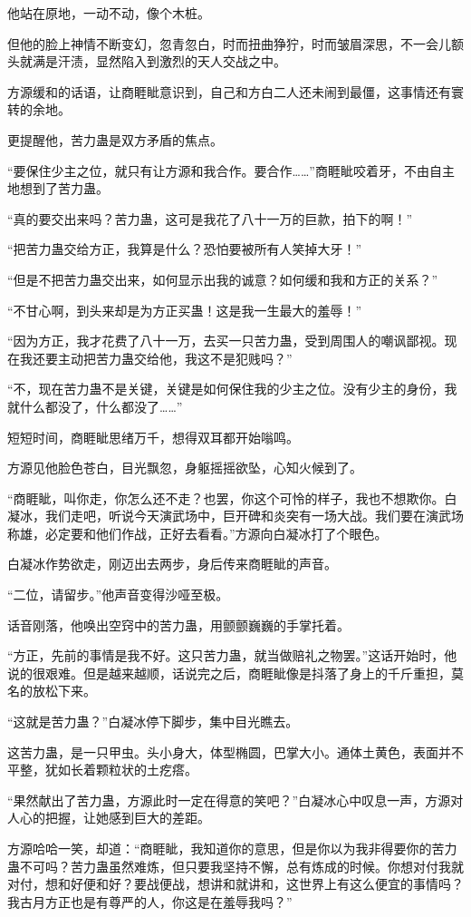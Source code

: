 \begin{this_body}
他站在原地，一动不动，像个木桩。

但他的脸上神情不断变幻，忽青忽白，时而扭曲狰狞，时而皱眉深思，不一会儿额头就满是汗渍，显然陷入到激烈的天人交战之中。

方源缓和的话语，让商睚眦意识到，自己和方白二人还未闹到最僵，这事情还有寰转的余地。

更提醒他，苦力蛊是双方矛盾的焦点。

“要保住少主之位，就只有让方源和我合作。要合作……”商睚眦咬着牙，不由自主地想到了苦力蛊。

“真的要交出来吗？苦力蛊，这可是我花了八十一万的巨款，拍下的啊！”

“把苦力蛊交给方正，我算是什么？恐怕要被所有人笑掉大牙！”

“但是不把苦力蛊交出来，如何显示出我的诚意？如何缓和我和方正的关系？”

“不甘心啊，到头来却是为方正买蛊！这是我一生最大的羞辱！”

“因为方正，我才花费了八十一万，去买一只苦力蛊，受到周围人的嘲讽鄙视。现在我还要主动把苦力蛊交给他，我这不是犯贱吗？”

“不，现在苦力蛊不是关键，关键是如何保住我的少主之位。没有少主的身份，我就什么都没了，什么都没了……”

短短时间，商睚眦思绪万千，想得双耳都开始嗡鸣。

方源见他脸色苍白，目光飘忽，身躯摇摇欲坠，心知火候到了。

“商睚眦，叫你走，你怎么还不走？也罢，你这个可怜的样子，我也不想欺你。白凝冰，我们走吧，听说今天演武场中，巨开碑和炎突有一场大战。我们要在演武场称雄，必定要和他们作战，正好去看看。”方源向白凝冰打了个眼色。

白凝冰作势欲走，刚迈出去两步，身后传来商睚眦的声音。

“二位，请留步。”他声音变得沙哑至极。

话音刚落，他唤出空窍中的苦力蛊，用颤颤巍巍的手掌托着。

“方正，先前的事情是我不好。这只苦力蛊，就当做赔礼之物罢。”这话开始时，他说的很艰难。但是越来越顺，话说完之后，商睚眦像是抖落了身上的千斤重担，莫名的放松下来。

“这就是苦力蛊？”白凝冰停下脚步，集中目光瞧去。

这苦力蛊，是一只甲虫。头小身大，体型椭圆，巴掌大小。通体土黄色，表面并不平整，犹如长着颗粒状的土疙瘩。

“果然献出了苦力蛊，方源此时一定在得意的笑吧？”白凝冰心中叹息一声，方源对人心的把握，让她感到巨大的差距。

方源哈哈一笑，却道：“商睚眦，我知道你的意思，但是你以为我非得要你的苦力蛊不可吗？苦力蛊虽然难炼，但只要我坚持不懈，总有炼成的时候。你想对付我就对付，想和好便和好？要战便战，想讲和就讲和，这世界上有这么便宜的事情吗？我古月方正也是有尊严的人，你这是在羞辱我吗？”


\end{this_body}
